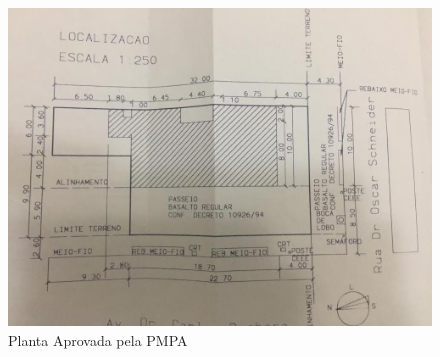 \documentclass[11pt]{article}
\begin{document}
\begin{figure}[htbp]
\centering
\includegraphics[width=.9\linewidth]{unnamed.jpg}
\caption{\label{fig:orga569bc6}
Planta Aprovada pela PMPA}
\end{figure}
\end{document}
